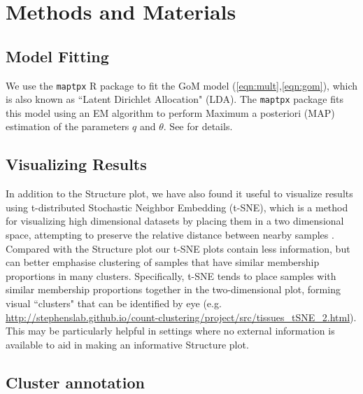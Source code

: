 \documentclass[10pt,letterpaper]{article}
\begin{document}

\section*{Methods and Materials}

\subsection*{Model Fitting}

We use the {\tt maptpx} R package \cite{Taddy2012} to fit the GoM model (\ref{eqn:mult},\ref{eqn:gom}), which is also known as ``Latent Dirichlet Allocation" (LDA).
The {\tt maptpx} package fits this model using an EM algorithm to perform Maximum a posteriori (MAP)  estimation of the parameters $q$ and $\theta$. See \cite{Taddy2012} for details.


\subsection*{Visualizing Results}

In addition to the Structure plot, we have also found it useful to visualize results using t-distributed Stochastic Neighbor Embedding (t-SNE), which is a method for visualizing high dimensional datasets by placing them in a two dimensional space, attempting to preserve the relative distance between nearby samples \cite{Maaten2014,Maaten2008}. Compared with the Structure plot our t-SNE plots contain less information, but can better emphasise clustering of samples that have similar membership proportions in many clusters. Specifically, t-SNE tends to place samples with similar membership proportions together in the two-dimensional plot, forming visual ``clusters" that can be identified by eye (e.g. \url{http://stephenslab.github.io/count-clustering/project/src/tissues_tSNE_2.html}). This may be particularly helpful in settings where no external information is available to aid in making an informative Structure plot.


\subsection*{Cluster annotation}
\end{document}
